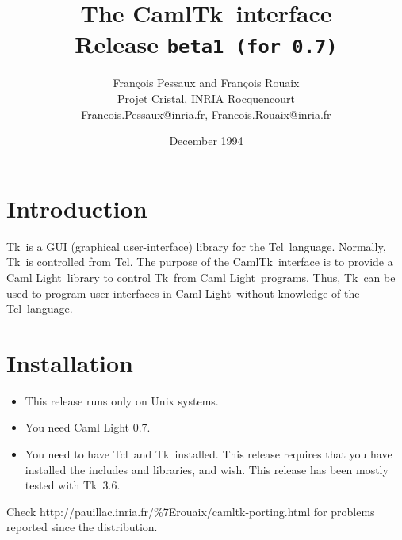 
\newcommand{\tcl}	{{\sf Tcl}}
\newcommand{\tk}	{{\sf Tk}}
\newcommand{\caml}	{{\sf Caml Light}}
\newcommand{\camltk}	{{\sf CamlTk}}
\newcommand{\wish}	{{\sf wish}}
\newcommand{\thisrelease}{{\tt beta1 (for 0.7)}}


\title{The \camltk\ interface \\
       Release \thisrelease}

\author{Fran\c{c}ois Pessaux and Fran\c{c}ois Rouaix \\
           Projet Cristal, INRIA Rocquencourt \\
        {\small Francois.Pessaux@inria.fr, Francois.Rouaix@inria.fr}
        }
\date{December 1994}


\maketitle
\tableofcontents
\newpage

\section*{Introduction}

\tk\ is a GUI (graphical user-interface) library for the \tcl\ language.
Normally, \tk\ is controlled from \tcl. The purpose of the \camltk\
interface is to provide a \caml\ library to control \tk\ from \caml\
programs. Thus, \tk\ can be used to program user-interfaces in \caml\
without knowledge of the \tcl\ language.

\section*{Installation}

\begin{itemize}
\item This release runs only on Unix systems.
\item You need Caml Light 0.7.
\item You need to have \tcl\ and \tk\ installed. This release requires that
you have installed the includes and libraries, and \wish.
This release has been mostly tested with \tk\ 3.6.
\end{itemize} 

\begin{htmlonly}
Check 
                  {http://pauillac.inria.fr/\%7Erouaix/camltk-porting.html}
for problems reported since the distribution.
\end{htmlonly}

